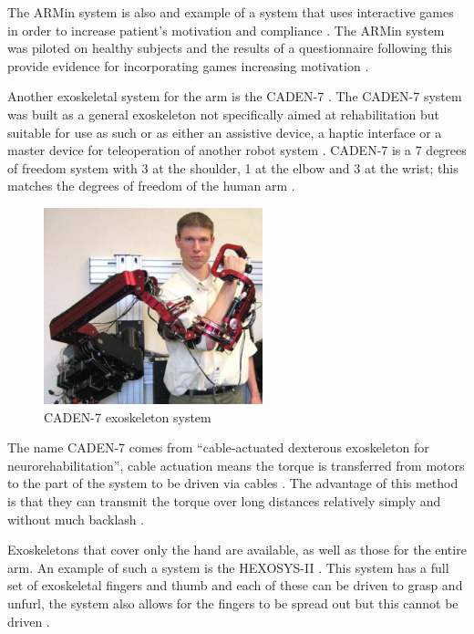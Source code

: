\documentclass[journal]{IEEEtran}
\begin{document}
The ARMin system is also and example of a system that uses interactive games in order to increase 
patient's motivation and compliance \cite{ADLVE,ARMin}. The ARMin system was piloted on healthy subjects and 
the results of a questionnaire following this provide evidence for incorporating games increasing 
motivation \cite{ARMin}.

Another exoskeletal system for the arm is the CADEN-7 \cite{CADEN}. The CADEN-7 system was built as a 
general exoskeleton not specifically aimed at rehabilitation but suitable for use as such or as either an 
assistive device, a haptic interface or a master device for teleoperation of another robot system \cite{CADEN}. 
CADEN-7 is a 7 degrees of freedom system with 3 at the shoulder, 1 at the elbow and 3 at the wrist; this 
matches the degrees of freedom of the human arm \cite{CADEN}.

\begin{figure}[!h]
\centering
\includegraphics[width=2.5in]{CADEN7.png}
\caption{CADEN-7 exoskeleton system \cite{CADEN}}
\label{CADEN7_fig}
\end{figure}

The name CADEN-7 comes from ``cable-actuated dexterous exoskeleton for neurorehabilitation'', 
cable actuation means the torque is transferred from motors to the part of the system to be driven 
via cables \cite{CADEN}. The advantage of this method is that they can transmit the torque over long 
distances relatively simply and without much backlash \cite{CADEN}.

Exoskeletons that cover only the hand are available, as well as those for the entire arm. An example of such a 
system is the HEXOSYS-II \cite{HandExo}. This system has a full set of exoskeletal fingers and thumb and 
each of these can be driven to grasp and unfurl, the system also allows for the fingers to be 
spread out but this cannot be driven \cite{HandExo}.
\end{document}
